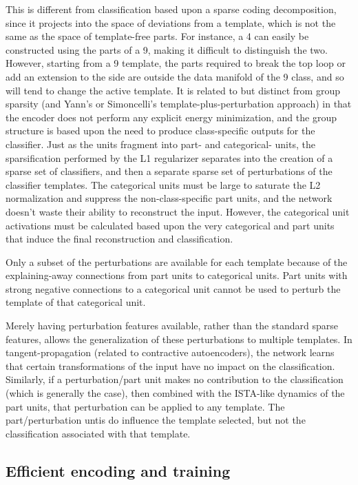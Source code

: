 \documentclass{article} %
\begin{document}
This is different from classification based upon a sparse coding decomposition, since it projects into the space of deviations from a template, which is not the same as the space of template-free parts.  For instance, a 4 can easily be constructed using the parts of a 9, making it difficult to distinguish the two.  However, starting from a 9 template, the parts required to break the top loop or add an extension to the side are outside the data manifold of the 9 class, and so will tend to change the active template.  It is related to but distinct from group sparsity (and Yann's or Simoncelli's template-plus-perturbation approach) in that the encoder does not perform any explicit energy minimization, and the group structure is based upon the need to produce class-specific outputs for the classifier.  Just as the units fragment into part- and categorical- units, the sparsification performed by the L1 regularizer separates into the creation of a sparse set of classifiers, and then a separate sparse set of perturbations of the classifier templates.  The categorical units must be large to saturate the L2 normalization and suppress the non-class-specific part units, and the network doesn't waste their ability to reconstruct the input.  However, the categorical unit activations must be calculated based upon the very categorical and part units that induce the final reconstruction and classification.

Only a subset of the perturbations are available for each template because of the explaining-away connections from part units to categorical units.  Part units with strong negative connections to a categorical unit cannot be used to perturb the template of that categorical unit.

Merely having perturbation features available, rather than the standard sparse features, allows the generalization of these perturbations to multiple templates.  In tangent-propagation (related to contractive autoencoders), the network learns that certain transformations of the input have no impact on the classification.  Similarly, if a perturbation/part unit makes no contribution to the classification (which is generally the case), then combined with the ISTA-like dynamics of the part units, that perturbation can be applied to any template.  The part/perturbation untis do influence the template selected, but not the classification associated with that template.


\subsection{Efficient encoding and training}
\end{document}
